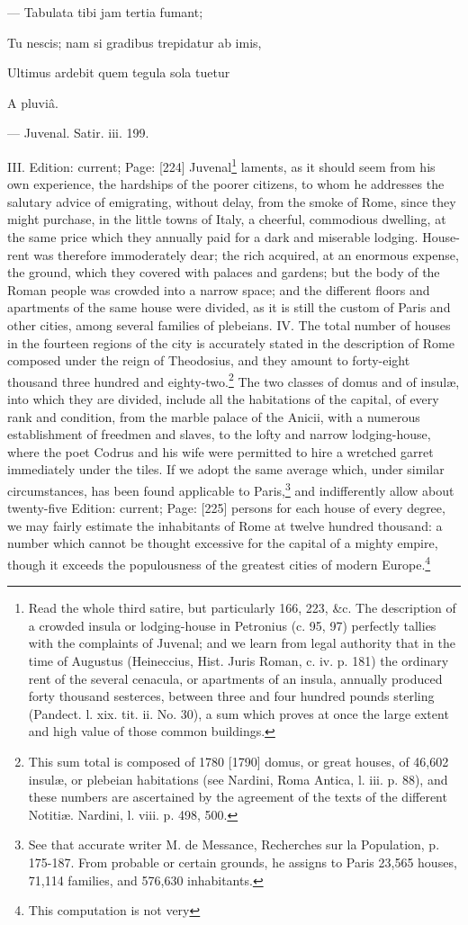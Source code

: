 {\texthebrew{—} Tabulata tibi jam tertia fumant;

Tu nescis; nam si gradibus trepidatur ab imis,

Ultimus ardebit quem tegula sola tuetur

A pluviâ.

\texthebrew{—} Juvenal. Satir. iii. 199.} III. Edition: current; Page: [224] Juvenal\footnote{Read the whole third satire, but particularly 166, 223, \&c. The description of a crowded insula or lodging-house in Petronius (c. 95, 97) perfectly tallies with the complaints of Juvenal; and we learn from legal authority that in the time of Augustus (Heineccius, Hist. Juris Roman, c. iv. p. 181) the ordinary rent of the several cenacula, or apartments of an insula, annually produced forty thousand sesterces, between three and four hundred pounds sterling (Pandect. l. xix. tit. ii. No. 30), a sum which proves at once the large extent and high value of those common buildings.} laments, as it should seem from his own experience, the hardships of the poorer citizens, to whom he addresses the salutary advice of emigrating, without delay, from the smoke of Rome, since they might purchase, in the little towns of Italy, a cheerful, commodious dwelling, at the same price which they annually paid for a dark and miserable lodging. House-rent was therefore immoderately dear; the rich acquired, at an enormous expense, the ground, which they covered with palaces and gardens; but the body of the Roman people was crowded into a narrow space; and the different floors and apartments of the same house were divided, as it is still the custom of Paris and other cities, among several families of plebeians. IV. The total number of houses in the fourteen regions of the city is accurately stated in the description of Rome composed under the reign of Theodosius, and they amount to forty-eight thousand three hundred and eighty-two.\footnote{This sum total is composed of 1780 [1790] domus, or great houses, of 46,602 insulæ, or plebeian habitations (see Nardini, Roma Antica, l. iii. p. 88), and these numbers are ascertained by the agreement of the texts of the different Notitiæ. Nardini, l. viii. p. 498, 500.} The two classes of domus and of insulæ, into which they are divided, include all the habitations of the capital, of every rank and condition, from the marble palace of the Anicii, with a numerous establishment of freedmen and slaves, to the lofty and narrow lodging-house, where the poet Codrus and his wife were permitted to hire a wretched garret immediately under the tiles. If we adopt the same average which, under similar circumstances, has been found applicable to Paris,\footnote{See that accurate writer M. de Messance, Recherches sur la Population, p. 175-187. From probable or certain grounds, he assigns to Paris 23,565 houses, 71,114 families, and 576,630 inhabitants.} and indifferently allow about twenty-five Edition: current; Page: [225] persons for each house of every degree, we may fairly estimate the inhabitants of Rome at twelve hundred thousand: a number which cannot be thought excessive for the capital of a mighty empire, though it exceeds the populousness of the greatest cities of modern Europe.\footnote{This computation is not very }
